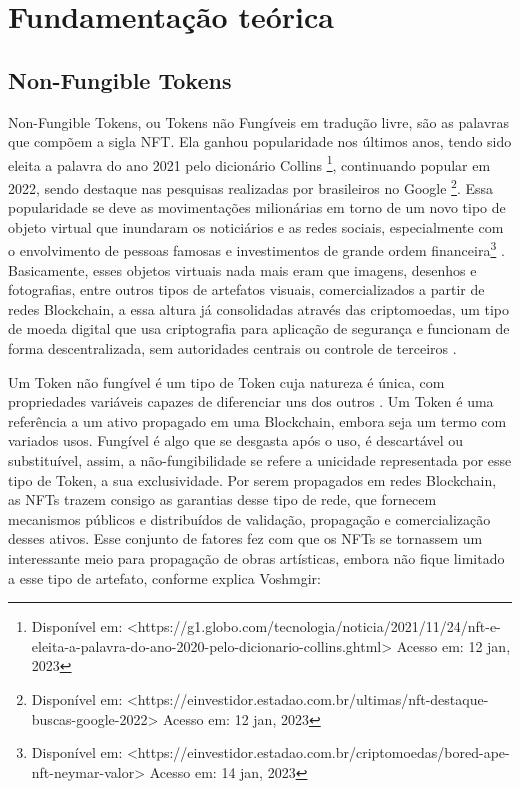 \chapter{Fundamentação teórica}
\label{cap:fundamentacao-teorica}

\section{Non-Fungible Tokens}
\label{cap:non-fungible tokens}

Non-Fungible Tokens, ou Tokens não Fungíveis em tradução livre, são as palavras que compõem a sigla NFT. Ela ganhou popularidade nos últimos anos, tendo sido eleita a palavra do ano 2021 pelo dicionário Collins \footnote{Disponível em: <https://g1.globo.com/tecnologia/noticia/2021/11/24/nft-e-eleita-a-palavra-do-ano-2020-pelo-dicionario-collins.ghtml> Acesso em: 12 jan, 2023}, continuando popular em 2022, sendo destaque nas pesquisas realizadas por brasileiros no Google \footnote{Disponível em: <https://einvestidor.estadao.com.br/ultimas/nft-destaque-buscas-google-2022> Acesso em: 12 jan, 2023}. Essa popularidade se deve as movimentações milionárias em torno de um novo tipo de objeto virtual que inundaram os noticiários e as redes sociais, especialmente com o envolvimento de pessoas famosas e investimentos de grande ordem financeira\footnote{Disponível em: <https://einvestidor.estadao.com.br/criptomoedas/bored-ape-nft-neymar-valor> Acesso em: 14 jan, 2023} . Basicamente, esses objetos virtuais nada mais eram que imagens, desenhos e fotografias, entre outros tipos de artefatos visuais, comercializados a partir de redes Blockchain, a essa altura já consolidadas através das criptomoedas, um tipo de moeda digital que usa criptografia para aplicação de segurança e funcionam de forma descentralizada, sem autoridades centrais ou controle de terceiros \cite{Chaves}.

Um Token não fungível é um tipo de Token cuja natureza é única, com propriedades variáveis capazes de diferenciar uns dos outros \cite{Voshmgir}. Um Token é uma referência a um ativo propagado em uma Blockchain, embora seja um termo com variados usos. Fungível é algo que se desgasta após o uso, é descartável ou substituível, assim, a não-fungibilidade se refere a unicidade representada por esse tipo de Token, a sua exclusividade. Por serem propagados em redes Blockchain, as NFTs trazem consigo as garantias desse tipo de rede, que fornecem mecanismos públicos e distribuídos de validação, propagação e comercialização desses ativos. Esse conjunto de fatores fez com que os NFTs se tornassem um interessante meio para propagação de obras artísticas, embora não fique limitado a esse tipo de artefato, conforme explica Voshmgir:

